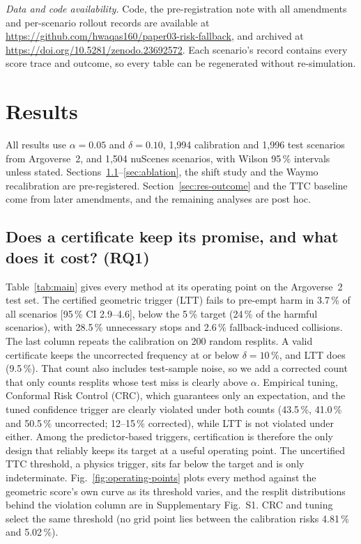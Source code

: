 \documentclass[lettersize,journal]{IEEEtran}
\begin{document}
\emph{Data and code availability.} Code, the pre-registration note with
all amendments and per-scenario rollout records are
available at \url{https://github.com/hwaqas160/paper03-risk-fallback},
and archived at \url{https://doi.org/10.5281/zenodo.23692572}. Each
scenario's record contains every score trace and outcome, so every table
can be regenerated without re-simulation.

\section{Results}
\label{sec:results}
All results use $\alpha = 0.05$ and $\delta = 0.10$, 1{,}994 calibration
and 1{,}996 test scenarios from Argoverse~2, and 1{,}504 nuScenes
scenarios, with Wilson 95\,\% intervals unless stated.
Sections~\ref{sec:res-main}--\ref{sec:ablation}, the shift study and the Waymo recalibration are pre-registered. Section~\ref{sec:res-outcome} and the TTC baseline come from later amendments, and the remaining analyses are post hoc.

\subsection{Does a certificate keep its promise, and what does it cost? (RQ1)}
\label{sec:res-main}
Table~\ref{tab:main} gives every method at its operating point on the
Argoverse~2 test set. The certified geometric trigger (LTT) fails to
pre-empt harm in 3.7\,\% of all scenarios [95\,\% CI 2.9--4.6], below the
5\,\% target (24\,\% of the harmful scenarios), with
28.5\,\% unnecessary stops and 2.6\,\% fallback-induced collisions. The last
column repeats the calibration on 200 random resplits. A valid certificate
keeps the uncorrected frequency at or below $\delta = 10\,\%$, and LTT does
(9.5\,\%). That count also includes test-sample noise, so we add a
corrected count that only counts resplits whose test miss is clearly above
$\alpha$. Empirical tuning, Conformal Risk Control (CRC), which guarantees
only an expectation, and the tuned confidence trigger are clearly violated
under both counts (43.5\,\%, 41.0\,\% and 50.5\,\% uncorrected; 12--15\,\%
corrected), while LTT is not violated under either. Among the predictor-based
triggers, certification is therefore the only design that reliably keeps its
target at a useful operating point. The uncertified TTC threshold, a physics
trigger, sits far below the target and is only indeterminate. Fig.~\ref{fig:operating-points} plots every method against
the geometric score's own curve as its threshold varies, and the
resplit distributions behind the violation column are in Supplementary
Fig.~S1. CRC and tuning select the same threshold (no grid point lies between the calibration risks 4.81\,\% and 5.02\,\%).
\end{document}
